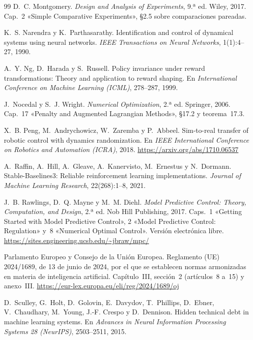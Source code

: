 \begin{thebibliography}{99}
D.~C. Montgomery.
\newblock \emph{Design and Analysis of Experiments}, 9.ª ed.
\newblock Wiley, 2017. Cap.~2 «Simple Comparative Experiments», §2.5 sobre comparaciones pareadas.

K.~S. Narendra y K.~Parthasarathy.
\newblock Identification and control of dynamical systems using neural networks.
\newblock \emph{IEEE Transactions on Neural Networks}, 1(1):4--27, 1990.

A.~Y. Ng, D.~Harada y S.~Russell.
\newblock Policy invariance under reward transformations: Theory and application to reward shaping.
\newblock En \emph{International Conference on Machine Learning (ICML)}, 278--287, 1999.

J.~Nocedal y S.~J. Wright.
\newblock \emph{Numerical Optimization}, 2.ª ed.
\newblock Springer, 2006. Cap.~17 «Penalty and Augmented Lagrangian Methods», §17.2 y teorema~17.3.

X.~B. Peng, M.~Andrychowicz, W.~Zaremba y P.~Abbeel.
\newblock Sim-to-real transfer of robotic control with dynamics randomization.
\newblock En \emph{IEEE International Conference on Robotics and Automation (ICRA)}, 2018.
\newblock \url{https://arxiv.org/abs/1710.06537}

A.~Raffin, A.~Hill, A.~Gleave, A.~Kanervisto, M.~Ernestus y N.~Dormann.
\newblock Stable-Baselines3: Reliable reinforcement learning implementations.
\newblock \emph{Journal of Machine Learning Research}, 22(268):1--8, 2021.

J.~B. Rawlings, D.~Q. Mayne y M.~M. Diehl.
\newblock \emph{Model Predictive Control: Theory, Computation, and Design}, 2.ª ed.
\newblock Nob Hill Publishing, 2017. Caps.~1 «Getting Started with Model Predictive Control», 2 «Model Predictive Control: Regulation» y~8 «Numerical Optimal Control». Versión electrónica libre.
\newblock \url{https://sites.engineering.ucsb.edu/~jbraw/mpc/}

Parlamento Europeo y Consejo de la Unión Europea.
\newblock Reglamento (UE) 2024/1689, de 13 de junio de 2024, por el que se establecen normas armonizadas en materia de inteligencia artificial. Capítulo~III, sección~2 (artículos~8 a~15) y anexo~III.
\newblock \url{https://eur-lex.europa.eu/eli/reg/2024/1689/oj}

D.~Sculley, G.~Holt, D.~Golovin, E.~Davydov, T.~Phillips, D.~Ebner, V.~Chaudhary, M.~Young, J.-F. Crespo y D.~Dennison.
\newblock Hidden technical debt in machine learning systems.
\newblock En \emph{Advances in Neural Information Processing Systems 28 (NeurIPS)}, 2503--2511, 2015.


\end{thebibliography}
